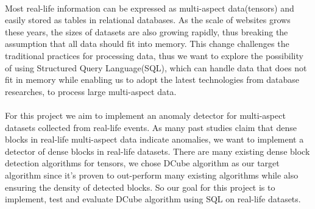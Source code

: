 
\paragraph{} Most real-life information can be expressed as multi-aspect data(tensors) and easily stored as tables in relational databases. As the scale of websites grows these years, the sizes of datasets are also growing rapidly,
thus breaking the assumption that all data should fit into memory. This change challenges the traditional practices for processing data, thus we want to explore the possibility of using Structured Query Language(SQL),
which can handle data that does not fit in memory while enabling us to adopt the latest technologies from database researches, to process large multi-aspect data.
\paragraph{} For this project we aim to implement an anomaly detector for multi-aspect datasets collected from real-life events. As many past studies claim that dense blocks in real-life multi-aspect data indicate anomalies, we want to implement a detector of dense blocks
in real-life datasets. There are many existing dense block detection algorithms for tensors, we chose DCube algorithm as our target algorithm since it's proven to out-perform many existing algorithms while also ensuring the density of detected
blocks. So our goal for this project is to implement, test and evaluate DCube algorithm using SQL on real-life datasets.